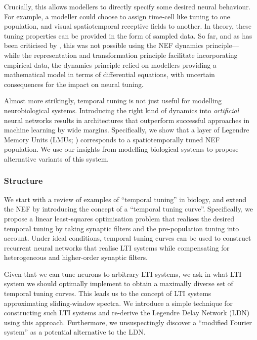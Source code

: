 Crucially, this allows modellers to directly specify some desired neural behaviour.
For example, a modeller could choose to assign time-cell like tuning \citep{pastalkova2008internally,tiganj2016sequential} to one population, and visual spatiotemporal receptive fields \citep{carandini1999linearity} to another.
In theory, these tuning properties can be provided in the form of sampled data.
So far, and as has been criticised by \citep{nicola2017supervised}, this was not possible using the NEF dynamics principle---while the representation and transformation principle facilitate incorporating empirical data, the dynamics principle relied on modellers providing a mathematical model in terms of differential equations, with uncertain consequences for the impact on neural tuning.

Almost more strikingly, temporal tuning is not just useful for modelling neurobiological systems.
Introducing the right kind of dynamics into \emph{artificial} neural networks results in architectures that outperform successful approaches in machine learning by wide margins.
Specifically, we show that a layer of Legendre Memory Units (LMUs; \cite{voelker2019lmu}) corresponds to a spatiotemporally tuned NEF population. We use our insights from modelling biological systems to propose alternative variants of this system.

\subsubsection{Structure}
We start  with a review of examples of \enquote{temporal tuning} in biology, and extend the NEF by introducing the concept of a \enquote{temporal tuning curve}.
Specifically, we propose a linear least-squares optimisation problem that realises the desired temporal tuning by taking synaptic filters and the pre-population tuning into account.
Under ideal conditions, temporal tuning curves can be used to construct recurrent neural networks that realise LTI systems while compensating for heterogeneous and higher-order synaptic filters.

Given that we can tune neurons to arbitrary LTI systems, we ask in  what LTI system we should optimally implement to obtain a maximally diverse set of temporal tuning curves.
This leads us to the concept of LTI systems approximating sliding-window spectra.
We introduce a simple technique for constructing such LTI systems and re-derive the Legendre Delay Network (LDN) using this approach.
Furthermore, we unsuspectingly discover a \enquote{modified Fourier system} as a potential alternative to the LDN.

